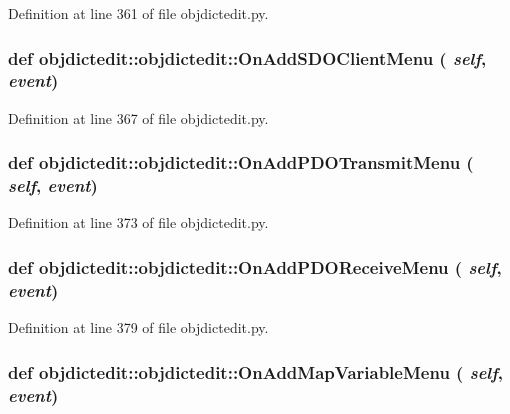 Definition at line 361 of file objdictedit.py.\hypertarget{classobjdictedit_1_1objdictedit_01b55597ca103c08c89d012ad6dced3d}{
\subsubsection[OnAddSDOClientMenu]{\setlength{\rightskip}{0pt plus 5cm}def objdictedit::objdictedit::On\-Add\-SDOClient\-Menu ( {\em self},  {\em event})}}
\label{classobjdictedit_1_1objdictedit_01b55597ca103c08c89d012ad6dced3d}




Definition at line 367 of file objdictedit.py.\hypertarget{classobjdictedit_1_1objdictedit_cc73bf94427a95e3399e56d7f275ab77}{
\subsubsection[OnAddPDOTransmitMenu]{\setlength{\rightskip}{0pt plus 5cm}def objdictedit::objdictedit::On\-Add\-PDOTransmit\-Menu ( {\em self},  {\em event})}}
\label{classobjdictedit_1_1objdictedit_cc73bf94427a95e3399e56d7f275ab77}




Definition at line 373 of file objdictedit.py.\hypertarget{classobjdictedit_1_1objdictedit_a5f8ca2068f63b91c92f40f9756400f6}{
\subsubsection[OnAddPDOReceiveMenu]{\setlength{\rightskip}{0pt plus 5cm}def objdictedit::objdictedit::On\-Add\-PDOReceive\-Menu ( {\em self},  {\em event})}}
\label{classobjdictedit_1_1objdictedit_a5f8ca2068f63b91c92f40f9756400f6}




Definition at line 379 of file objdictedit.py.\hypertarget{classobjdictedit_1_1objdictedit_c3a4bad410a580a07dad03a4f8ba121c}{
\subsubsection[OnAddMapVariableMenu]{\setlength{\rightskip}{0pt plus 5cm}def objdictedit::objdictedit::On\-Add\-Map\-Variable\-Menu ( {\em self},  {\em event})}}
\label{classobjdictedit_1_1objdictedit_c3a4bad410a580a07dad03a4f8ba121c}




